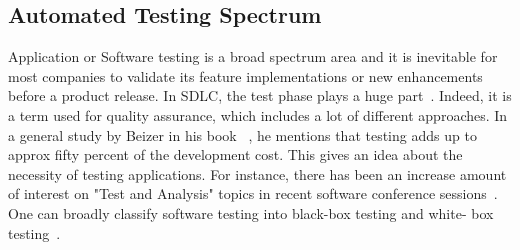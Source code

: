 \subsection{Automated Testing Spectrum}

Application or Software testing is a broad spectrum area and it is inevitable for most companies to validate its feature implementations or new enhancements before a product release. In \ac{SDLC}, the test phase plays a huge part~\parencite{nidhra2012black}. Indeed, it is a term used for quality assurance, which includes a lot of different approaches. In a general study by Beizer in his book ~\parencite{beizer2003software}, he mentions that testing adds up to approx fifty percent of the development cost. This gives an idea about the necessity of testing applications. For instance, there has been an increase amount of interest on "Test and Analysis" topics in recent software conference sessions~\parencite{4221614}. One can broadly classify software testing into black-box testing and white- box testing~\parencite{liu2009covering}. 

